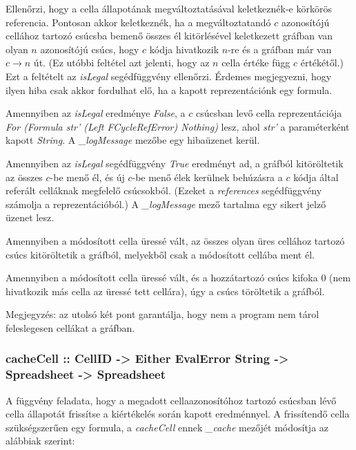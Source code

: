 \begin{compactenum}
	\item Ellenőrzi, hogy a cella állapotának megváltoztatásával keletkeznék-e 		körkörös referencia. Pontosan akkor keletkeznék, ha a megváltoztatandó $c$ 	azonosítójú cellához tartozó csúcsba bemenő összes él kitörlésével keletkezett gráfban van olyan $n$ azonosítójú csúcs, hogy $c$ kódja hivatkozik $n$-re és a gráfban már van $c \rightarrow n$ út. (Ez utóbbi feltétel azt jelenti, hogy az $n$ cella értéke függ $c$ értékétől.) Ezt a feltételt az \textit{isLegal} segédfüggvény ellenőrzi. Érdemes megjegyezni, hogy ilyen hiba csak akkor fordulhat elő, ha a kapott reprezentációnk egy formula.
	\item Amennyiben az \textit{isLegal} eredménye \textit{False}, a $c$ csúcsban levő cella reprezentációja \textit{For (Formula str' (Left FCycleRefError) Nothing)} lesz, ahol \textit{str'} a paraméterként kapott \textit{String}. A \textit{\_logMessage} mezőbe egy hibaüzenet kerül.
	\item Amennyiben az \textit{isLegal} segédfüggvény \textit{True} eredményt ad, a gráfból kitöröltetik az összes $c$-be menő él, és új $c$-be menő élek kerülnek behúzásra a $c$ kódja által referált celláknak megfelelő csúcsokból. (Ezeket a \textit{references} segédfüggvény számolja a reprezentációból.) A \textit{\_logMessage} mező tartalma egy sikert jelző üzenet lesz.
	\item Amennyiben a módosított cella üressé vált, az összes olyan üres cellához tartozó csúcs kitöröltetik a gráfból, melyekből csak a módosított cellába ment él.
	\item Amennyiben a módosított cella üressé vált, és a hozzátartozó csúcs kifoka 0 (nem hivatkozik más cella az üressé tett cellára), úgy a csúcs töröltetik a gráfból.
\end{compactenum}

Megjegyzés: az utolsó két pont garantálja, hogy nem a program nem tárol feleslegesen cellákat a gráfban.

\subsubsection{cacheCell :: CellID -> Either EvalError String -> Spreadsheet -> Spreadsheet}

A függvény feladata, hogy a megadott cellaazonosítóhoz tartozó csúcsban lévő cella állapotát frissítse a kiértékelés során kapott eredménnyel. A frissítendő cella szükségszerűen egy formula, a \textit{cacheCell} ennek \textit{\_cache} mezőjét módosítja az alábbiak szerint:

